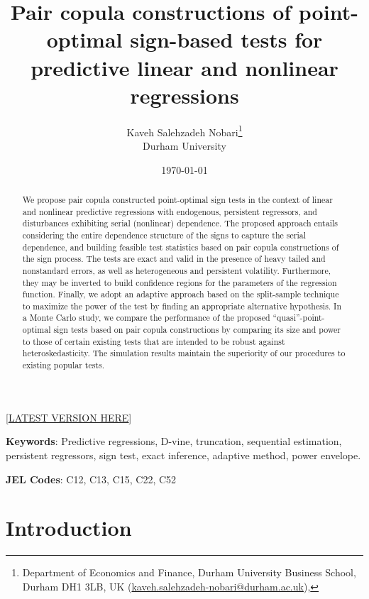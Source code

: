 \documentclass[harvard,11pt]{article}
\begin{document}
\title{{Pair copula constructions of point-optimal sign-based tests for predictive linear and nonlinear regressions}}
\author{Kaveh Salehzadeh Nobari\thanks{%
Department of Economics and Finance, Durham University Business School, Durham DH1 3LB, UK
(\href{emailto: kaveh.salehzadeh-nobari@durham.ac.uk}{kaveh.salehzadeh-nobari@durham.ac.uk}),}
\\Durham University}
\date{\today}
\maketitle
\begin{center}
[\href{https://kavehsn.github.io/Job-Market-Paper/PCC_POS_2020.pdf}{\underline{LATEST VERSION HERE}}]
\end{center}


\begin{abstract}
We propose pair copula constructed point-optimal sign tests in the context of linear and nonlinear predictive regressions with endogenous, persistent regressors, and disturbances exhibiting serial (nonlinear) dependence. The proposed approach entails considering the entire dependence structure of the signs to capture the serial dependence, and building feasible test statistics based on pair copula constructions of the sign process. The tests are exact and valid in the presence of heavy tailed and nonstandard errors, as well as heterogeneous and persistent volatility. Furthermore, they may be inverted to build confidence regions for the parameters of the regression function. Finally, we adopt an adaptive approach based on the split-sample technique to maximize the power of the test by finding an appropriate alternative hypothesis. In a Monte Carlo study, we compare the performance of the proposed \textquotedblleft quasi\textquotedblright-point-optimal sign tests based on pair copula constructions by comparing its size and power to those of certain existing tests that are intended to be robust against heteroskedasticity. The simulation results maintain the superiority of our procedures to existing popular tests.   
\end{abstract}


\noindent \textbf{Keywords}: Predictive regressions, D-vine, truncation, sequential estimation, persistent regressors, sign test, exact inference, adaptive method, power envelope.

\noindent \textbf{JEL Codes}: C12, C13, C15, C22, C52

\newpage
\section{Introduction \label{Introduction}}
\end{document}
